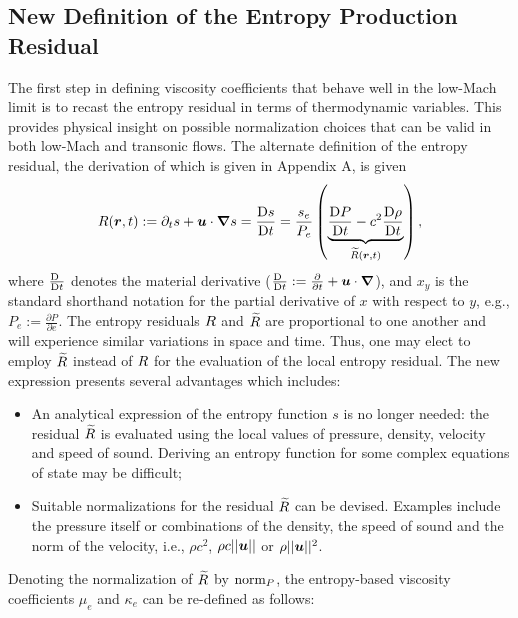 \subsection{New Definition of the Entropy Production Residual}\label{sec:new_ent_prod} 

The first step in defining viscosity coefficients that behave well in the low-Mach limit is to recast the entropy residual in terms of thermodynamic variables. This provides physical insight on possible normalization choices that can be valid in both low-Mach and transonic flows. The alternate definition of the entropy residual, the derivation of which is given in Appendix A, is given %
%
\begin{equation}
\label{eq:ent_res}
R(\boldsymbol r,t) := \partial_t s + \boldsymbol u \cdot \boldsymbol{\nabla} s = \frac{\textrm{D} s}{\textrm{D} t} = \frac{s_e}{P_e} \left( \underbrace{\frac{\textrm{D} P}{\textrm{D} t} - c^2 \frac{\textrm{D} \rho}{\textrm{D} t} }_{\widetilde{R}(\boldsymbol r,t)} \right) ,
\end{equation} 
%
where $\frac{\textrm{D} \ }{\textrm{D} t}$ denotes the material derivative ($\frac{\textrm{D} \ }{\textrm{D} t}:= \frac{\partial}{\partial t} + \boldsymbol u \cdot \boldsymbol{\nabla}$), and $x_y$ is the standard shorthand notation for the partial derivative of $x$ with respect to $y$, e.g., $P_e:=\frac{\partial P}{\partial e}$. 
%
The entropy residuals $R$ and $\widetilde{R}$ are proportional to one another and will experience similar variations in space and time. Thus, one may elect to employ $\widetilde{R}$ instead of $R$ for the evaluation of the local entropy residual. The new expression presents several advantages which includes:
%
\begin{itemize}
\item An analytical expression of the entropy function $s$ is no longer needed: the residual $\widetilde{R}$ is evaluated using the local values of pressure, density, velocity and speed of sound. Deriving an entropy function for some complex equations of state may be difficult;
\item Suitable normalizations for the residual $\widetilde{R}$ can be devised. Examples include the pressure itself or combinations of the density, the speed of sound and the norm of the velocity, i.e., $\rho c^2$, $\rho c || \boldsymbol u ||$ or $\rho || \boldsymbol u ||^2$. 
\end{itemize}
%
Denoting the normalization of $\widetilde{R}$ by $\textrm{norm}_P$, the entropy-based viscosity coefficients $\mu_e$ and $\kappa_e$ can be re-defined as follows:
